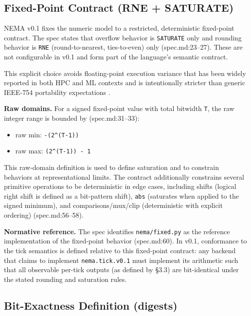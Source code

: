 \subsection{Fixed-Point Contract (RNE + SATURATE)}

NEMA v0.1 fixes the numeric model to a restricted, deterministic fixed-point contract. The spec states that overflow behavior is \texttt{SATURATE} only and rounding behavior is \texttt{RNE} (round-to-nearest, ties-to-even) only (spec.md:23--27). These are not configurable in v0.1 and form part of the language's semantic contract.

This explicit choice avoids floating-point execution variance that has been widely reported in both HPC and ML contexts \cite{ShanmugaveluArxiv2408.05148,AhrensTOMS2020ReproSum,BlanchardSIAM2020FABsum} and is intentionally stricter than generic IEEE-754 portability expectations \cite{IEEE754_2019}.

\textbf{Raw domains.} For a signed fixed-point value with total bitwidth \texttt{T}, the raw integer range is bounded by (spec.md:31--33):
\begin{itemize}
\item raw min: \texttt{-(2\^{}(T-1))}
\item raw max: \texttt{(2\^{}(T-1)) - 1}
\end{itemize}

This raw-domain definition is used to define saturation and to constrain behaviors at representational limits. The contract additionally constrains several primitive operations to be deterministic in edge cases, including shifts (logical right shift is defined as a bit-pattern shift), \texttt{abs} (saturates when applied to the signed minimum), and comparisons/mux/clip (deterministic with explicit ordering) (spec.md:56--58).

\textbf{Normative reference.} The spec identifies \texttt{nema/fixed.py} as the reference implementation of the fixed-point behavior (spec.md:60). In v0.1, conformance to the tick semantics is defined relative to this fixed-point contract: any backend that claims to implement \texttt{nema.tick.v0.1} must implement its arithmetic such that all observable per-tick outputs (as defined by \S3.3) are bit-identical under the stated rounding and saturation rules.

\subsection{Bit-Exactness Definition (digests)}


